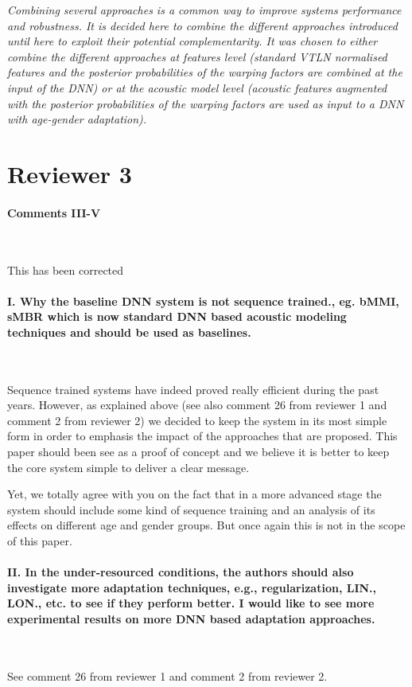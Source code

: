 \documentclass[]{article}
\begin{document}
\textit{Combining several approaches is a common way to improve systems performance and robustness. It is decided here to combine the different approaches introduced until here to exploit their potential complementarity. It was chosen to either combine the different approaches at features level (standard VTLN normalised features and the posterior probabilities of the warping factors are combined at the input of the DNN) or at the acoustic model level (acoustic features augmented with the posterior probabilities of the warping factors are used as input to a DNN with age-gender adaptation).}



\section{Reviewer 3}

\paragraph{Comments III-V}

~

This has been corrected

\paragraph{I. Why the baseline DNN system is not sequence trained., eg. bMMI, sMBR which is now standard DNN based acoustic modeling techniques and should be used as baselines.}

~

Sequence trained systems have indeed proved really efficient during the past years. However, as explained above (see also comment 26 from reviewer 1 and comment 2 from reviewer 2) we decided to keep the system in its most simple form in order to emphasis the impact of the approaches that are proposed. This paper should been see as a proof of concept and we believe it is better to keep the core system simple to deliver a clear message. 

Yet, we totally agree with you on the fact that in a more advanced stage the system should include some kind of sequence training and an analysis of its effects on different age and gender groups. But once again this is not in the scope of this paper.
\paragraph{II. In the under-resourced conditions, the authors should also investigate more adaptation techniques, e.g., regularization, LIN., LON., etc. to see if they perform better. I would like to see more experimental results on more DNN based adaptation approaches.}

~

See comment 26 from reviewer 1 and comment 2 from reviewer 2.
\end{document}
